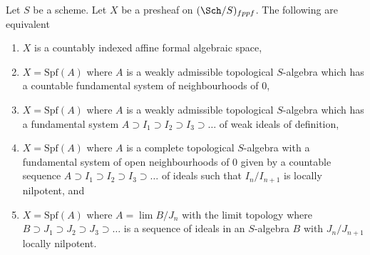 \begin{lemma}
\label{lemma-countably-indexed}
Let $S$ be a scheme. Let $X$ be a presheaf on $(\Sch/S)_{fppf}$.
The following are equivalent
\begin{enumerate}
\item $X$ is a countably indexed affine formal algebraic space,
\item $X = \text{Spf}(A)$ where $A$ is a weakly admissible topological
$S$-algebra which has a countable fundamental system of neighbourhoods of $0$,
\item $X = \text{Spf}(A)$ where $A$ is a weakly admissible topological
$S$-algebra which has a fundamental system
$A \supset I_1 \supset I_2 \supset I_3 \supset \ldots$
of weak ideals of definition,
\item $X = \text{Spf}(A)$ where $A$ is a complete topological $S$-algebra
with a fundamental system of open neighbourhoods of $0$ given by a
countable sequence $A \supset I_1 \supset I_2 \supset I_3 \supset \ldots$
of ideals such that $I_n/I_{n + 1}$ is locally nilpotent, and
\item $X = \text{Spf}(A)$ where $A = \lim B/J_n$ with the limit topology
where $B \supset J_1 \supset J_2 \supset J_3 \supset \ldots$ is a
sequence of ideals in an $S$-algebra $B$ with $J_n/J_{n + 1}$
locally nilpotent.
\end{enumerate}
\end{lemma}

